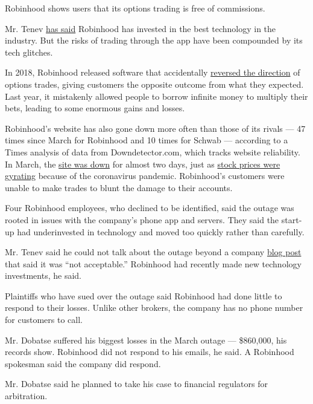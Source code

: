 Robinhood shows users that its options trading is free of commissions.~

Mr. Tenev
\href{https://www.wealthmanagement.com/technology/robinhood-ceo-schwab-fidelity-not-really-technology-companies}{has
said} Robinhood has invested in the best technology in the industry. But
the risks of trading through the app have been compounded by its tech
glitches.

In 2018, Robinhood released software that accidentally
\href{https://www.elitetrader.com/et/threads/robinhood-options-errors.327998/}{reversed
the direction} of options trades, giving customers the opposite outcome
from what they expected. Last year, it mistakenly allowed people to
borrow infinite money to multiply their bets, leading to some enormous
gains and losses.

Robinhood's website has also gone down more often than those of its
rivals --- 47 times since March for Robinhood and 10 times for Schwab
--- according to a Times analysis of data from Downdetector.com, which
tracks website reliability. In March, the
\href{https://www.nytimes3xbfgragh.onion/2020/03/03/technology/trading-app-robinhood-outage.html}{site
was down} for almost two days, just as
\href{https://www.nytimes3xbfgragh.onion/2020/03/11/business/bear-market-stocks-dow.html}{stock
prices were gyrating} because of the coronavirus pandemic. Robinhood's
customers were unable to make trades to blunt the damage to their
accounts.

Four Robinhood employees, who declined to be identified, said the outage
was rooted in issues with the company's phone app and servers. They said
the start-up had underinvested in technology and moved too quickly
rather than carefully.

Mr. Tenev said he could not talk about the outage beyond a company
\href{https://blog.robinhood.com/news/2020/3/3/an-update-from-robinhoods-founders}{blog
post} that said it was ``not acceptable.'' Robinhood had recently made
new technology investments, he said.

Plaintiffs who have sued over the outage said Robinhood had done little
to respond to their losses. Unlike other brokers, the company has no
phone number for customers to call.

Mr. Dobatse suffered his biggest losses in the March outage ---
\$860,000, his records show. Robinhood did not respond to his emails, he
said. A Robinhood spokesman said the company did respond.

Mr. Dobatse said he planned to take his case to financial regulators for
arbitration.

